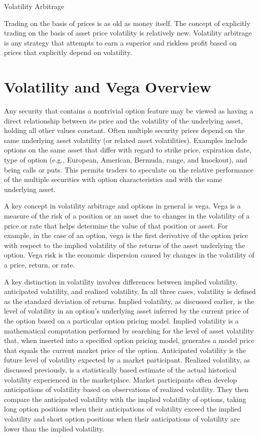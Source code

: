\documentclass[11pt]{article}
\begin{document}
Volatility Arbitrage

Trading on the basis of prices is as old as money itself. The concept of explicitly trading on the basis of asset price volatility is relatively new. Volatility arbitrage is any strategy that attempts to earn a superior and riskless profit based on prices that explicitly depend on volatility.

\section*{Volatility and Vega Overview}
Any security that contains a nontrivial option feature may be viewed as having a direct relationship between its price and the volatility of the underlying asset, holding all other values constant. Often multiple security prices depend on the same underlying asset volatility (or related asset volatilities). Examples include options on the same asset that differ with regard to strike price, expiration date, type of option (e.g., European, American, Bermuda, range, and knockout), and being calls or puts. This permits traders to speculate on the relative performance of the multiple securities with option characteristics and with the same underlying asset.

A key concept in volatility arbitrage and options in general is vega. Vega is a measure of the risk of a position or an asset due to changes in the volatility of a price or rate that helps determine the value of that position or asset. For example, in the case of an option, vega is the first derivative of the option price with respect to the implied volatility of the returns of the asset underlying the option. Vega risk is the economic dispersion caused by changes in the volatility of a price, return, or rate.

A key distinction in volatility involves differences between implied volatility, anticipated volatility, and realized volatility. In all three cases, volatility is defined as the standard deviation of returns. Implied volatility, as discussed earlier, is the level of volatility in an option's underlying asset inferred by the current price of the option based on a particular option pricing model. Implied volatility is a mathematical computation performed by searching for the level of asset volatility that, when inserted into a specified option pricing model, generates a model price that equals the current market price of the option. Anticipated volatility is the future level of volatility expected by a market participant. Realized volatility, as discussed previously, is a statistically based estimate of the actual historical volatility experienced in the marketplace. Market participants often develop anticipations of volatility based on observations of realized volatility. They then compare the anticipated volatility with the implied volatility of options, taking long option positions when their anticipations of volatility exceed the implied volatility and short option positions when their anticipations of volatility are lower than the implied volatility.
\end{document}
